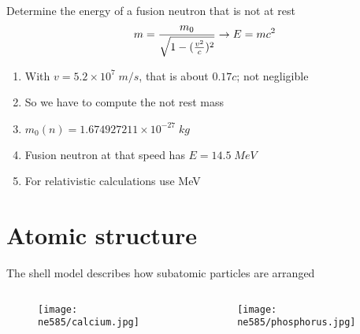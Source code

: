 \documentclass[aspectratio=1610,pdftex,dvipsnames,compress,xcolor={dvipsnames}]{beamer}
\begin{document}
\begin{frame}{Determine the energy of a fusion neutron that is not at rest}
    \begin{equation}
        \LARGE 
        m = \frac{m_0}{\sqrt{1-(\frac{v^2}{c})^2}} \rightarrow E = m c^2
    \end{equation}
    
    \vspace*{\fill}

    \begin{enumerate}[series=outerlist,topsep=0pt,itemsep=21pt,leftmargin=*,label=(\arabic*)]
        \item[]With $v = 5.2 \times 10^7 \; m/s$, that is about $0.17c$; not negligible
        \item[]So we have to compute the not rest mass
        \item[]$m_0(n) = 1.674927211 \times 10^{-27} \; kg$
        \item[]Fusion neutron at that speed has $E = 14.5 \; MeV$
        \item[]For relativistic calculations use MeV
    \end{enumerate}
\end{frame}


\section{Atomic structure}


\addtocounter{framenumber}{-1}
\begin{frame}{The shell model describes how subatomic particles are arranged}
    \begin{columns}

        \begin{column}{0.50\textwidth}
            \begin{figure}
                \centering
                \texttt{[image: ne585/calcium.jpg]}
            \end{figure}
        \end{column}

        \begin{column}{0.50\textwidth}
            \begin{figure}
                \centering
                \texttt{[image: ne585/phosphorus.jpg]}
            \end{figure}
        \end{column}

    \end{columns}
\end{frame}
\end{document}
